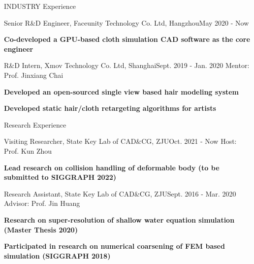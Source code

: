 \documentclass{resume} %
\begin{document}
\begin{rSection}{INDUSTRY Experience}
  \begin{rSubsection}{Senior R\&D Engineer, Faceunity Technology Co. Ltd, Hangzhou}{May 2020 - Now}
    {}{}
\item {\bf Co-developed a GPU-based cloth simulation CAD software as the core engineer}
  \end{rSubsection}
  \begin{rSubsection}{R\&D Intern, Xmov Technology Co. Ltd, Shanghai}{Sept. 2019 - Jan. 2020}
    {Mentor: Prof. Jinxiang Chai}{}
\item {\bf Developed an open-sourced single view based hair modeling system}
\item {\bf Developed static hair/cloth retargeting algorithms for artists} 
  \end{rSubsection}
\end{rSection}

\begin{rSection}{Research Experience}
  \begin{rSubsection}{Visiting Researcher, State Key Lab of CAD\&CG, ZJU}{Oct. 2021 - Now}
    {Host: Prof. Kun Zhou}{}
\item {\bf Lead research on collision handling of deformable body (to be submitted to SIGGRAPH 2022)}
  \end{rSubsection}  
  \begin{rSubsection}{Research Assistant, State Key Lab of CAD\&CG, ZJU}{Sept. 2016 - Mar. 2020}
    {Advisor: Prof. Jin Huang}{}
  \item {\bf Research on super-resolution of shallow water equation simulation (Master Thesis 2020)}
  \item {\bf Participated in research on numerical coarsening of FEM based simulation (SIGGRAPH 2018)}
  \end{rSubsection}
  
\end{rSection}
\end{document}
